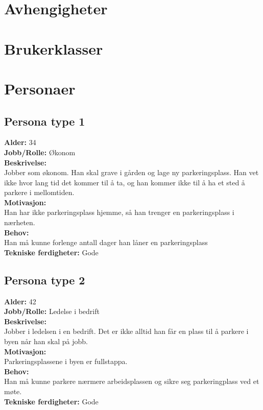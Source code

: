 \documentclass[12pt]{article}
\begin{document}
\section{Avhengigheter}

\section{Brukerklasser}

\section{Personaer}

    \subsection{Persona type 1}
    \textbf{Alder:} 34\\
    \textbf{Jobb/Rolle:}
    Økonom\\
    \textbf{Beskrivelse:}\\
    Jobber som økonom. Han skal grave i gården og lage ny parkeringsplass. Han vet ikke hvor lang tid det kommer til å ta, og han kommer ikke til å ha et sted å parkere i mellomtiden.\\
    \textbf{Motivasjon:}\\
    Han har ikke parkeringsplass hjemme, så han trenger en parkeringsplass i nærheten.\\
    \textbf{Behov:}\\
    Han må kunne forlenge antall dager han låner en parkeringsplass\\
    \textbf{Tekniske ferdigheter:} Gode

    \subsection{Persona type 2}
    \textbf{Alder:} 42\\
    \textbf{Jobb/Rolle:} Ledelse i bedrift\\
    \textbf{Beskrivelse:}\\
    Jobber i ledelsen i en bedrift. Det er ikke alltid han får en plass til å parkere i byen når han skal på jobb.\\
    \textbf{Motivasjon:}\\
    Parkeringsplassene i byen er fullstappa.\\
    \textbf{Behov:}\\
    Han må kunne parkere nærmere arbeidsplassen og sikre seg parkeringplass ved et møte.\\
    \textbf{Tekniske ferdigheter:} Gode
\end{document}
